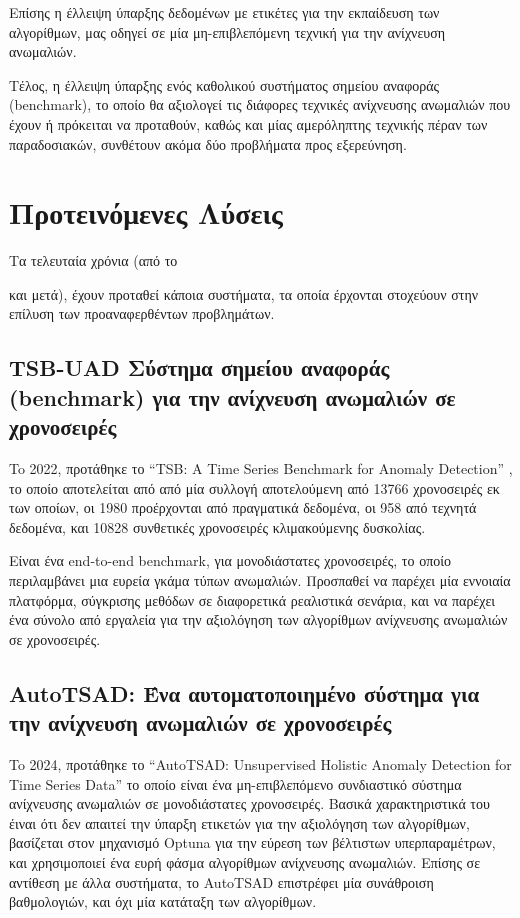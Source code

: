 Επίσης η έλλειψη ύπαρξης δεδομένων με ετικέτες για την εκπαίδευση των αλγορίθμων, μας οδηγεί σε μία μη-επιβλεπόμενη τεχνική για την ανίχνευση ανωμαλιών.

Τέλος, η έλλειψη ύπαρξης ενός καθολικού συστήματος σημείου αναφοράς (benchmark), το οποίο θα αξιολογεί τις διάφορες τεχνικές ανίχνευσης ανωμαλιών που έχουν ή πρόκειται να προταθούν, καθώς και μίας αμερόληπτης τεχνικής πέραν των παραδοσιακών, συνθέτουν ακόμα δύο προβλήματα προς εξερεύνηση.



\section{Προτεινόμενες Λύσεις}

Τα τελευταία χρόνια (από το \date{2022} και μετά), έχουν προταθεί κάποια συστήματα, τα οποία έρχονται στοχεύουν στην επίλυση των προαναφερθέντων προβλημάτων.

\subsection{TSB-UAD Σύστημα σημείου αναφοράς (benchmark) για την ανίχνευση ανωμαλιών σε χρονοσειρές}

To 2022, προτάθηκε το \enquote{TSB: A Time Series Benchmark for Anomaly Detection} \cite{paparrizos2022tsb}, το οποίο αποτελείται από από μία συλλογή  αποτελούμενη από 13766 χρονοσειρές εκ των οποίων, οι 1980 προέρχονται από πραγματικά δεδομένα, οι 958 από τεχνητά δεδομένα, και 10828 συνθετικές χρονοσειρές κλιμακούμενης δυσκολίας.

Είναι ένα end-to-end benchmark, για μονοδιάστατες χρονοσειρές, το οποίο περιλαμβάνει μια ευρεία γκάμα τύπων ανωμαλιών. Προσπαθεί να παρέχει μία εννοιαία πλατφόρμα, σύγκρισης μεθόδων σε διαφορετικά ρεαλιστικά σενάρια, και να παρέχει ένα σύνολο από εργαλεία για την αξιολόγηση των αλγορίθμων ανίχνευσης ανωμαλιών σε χρονοσειρές.

\subsection{AutoTSAD: Ένα αυτοματοποιημένο σύστημα για την ανίχνευση ανωμαλιών σε χρονοσειρές}

To 2024, προτάθηκε το \enquote{AutoTSAD: Unsupervised Holistic Anomaly Detection for Time Series Data} \cite{schmidl2024autotsad} το οποίο είναι ένα μη-επιβλεπόμενο συνδιαστικό σύστημα ανίχνευσης ανωμαλιών σε μονοδιάστατες χρονοσειρές. Βασικά χαρακτηριστικά του έιναι ότι δεν απαιτεί την ύπαρξη ετικετών για την αξιολόγηση των αλγορίθμων, βασίζεται στον μηχανισμό Optuna \cite{akiba2019optuna} για την εύρεση των βέλτιστων υπερπαραμέτρων, και χρησιμοποιεί ένα ευρή φάσμα αλγορίθμων ανίχνευσης ανωμαλιών. Επίσης σε αντίθεση με άλλα συστήματα, το AutoTSAD επιστρέφει μία συνάθροιση βαθμολογιών, και όχι μία κατάταξη των αλγορίθμων. 

